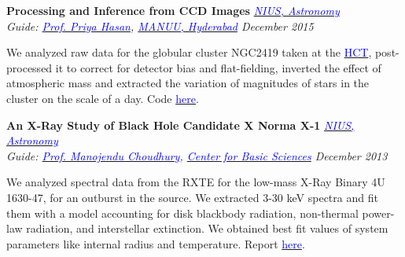 \documentclass[margin,line]{res}
\newenvironment{list1}{
  \begin{list}{\ding{113}}{%
      \setlength{\itemsep}{0in}
      \setlength{\parsep}{0in} \setlength{\parskip}{0in}
      \setlength{\topsep}{0in} \setlength{\partopsep}{0in} 
      \setlength{\leftmargin}{0.17in}}}{\end{list}}
\begin{document}
\begin{resume}
\vspace*{-0.1in}

{\bf Processing and Inference from CCD Images} \hfill \textit{\href{http://nius.hbcse.tifr.res.in/}{\textcolor{blue} {NIUS, Astronomy}}} \\
{\em Guide: \href{http://http://manuu.ac.in/deptphysc_faclty.php/}{\textcolor{blue}{Prof. Priya Hasan}}, \href{http://manuu.ac.in/}{\textcolor{blue} {MANUU, Hyderabad}} \hfill December 2015} \\
\vspace*{-.15in}
\begin{list1}
\item[] We analyzed raw data for the globular cluster NGC2419 taken at the \href{http://www.iiap.res.in/iao/cycle.html}{\textcolor{blue} {HCT}}, post-processed it to correct for detector bias and flat-fielding, inverted the effect of atmospheric mass and extracted the variation of magnitudes of stars in the cluster on the scale of a day. Code \href{https://github.com/alankarkotwal/ngc2419-variables}{\textcolor{blue} {here}}.
\end{list1}

\vspace*{-0.1in}

{\bf An X-Ray Study of Black Hole Candidate X Norma X-1} \hfill \textit{\href{http://nius.hbcse.tifr.res.in/}{\textcolor{blue} {NIUS, Astronomy}}} \\
{\em Guide: \href{http://cbs.ac.in/people/visiting-scientists/manojendu-choudhury}{\textcolor{blue}{Prof. Manojendu Choudhury}}, \href{http://cbs.ac.in/}{\textcolor{blue} {Center for Basic Sciences}} \hfill December 2013} \\
\vspace*{-.15in}
\begin{list1}
\item[] We analyzed spectral data from the RXTE for the low-mass X-Ray Binary 4U 1630-47, for an outburst in the source. We extracted 3-30 keV spectra and fit them with a model accounting for disk blackbody radiation, non-thermal power-law radiation, and interstellar extinction. We obtained best fit values of system parameters like internal radius and temperature. Report \href{https://alankarkotwal.github.io/4U_1630-47_Report.pdf}{\textcolor{blue} {here}}.
\end{list1}

\vspace*{-0.1in}


\end{resume}
\end{document}
